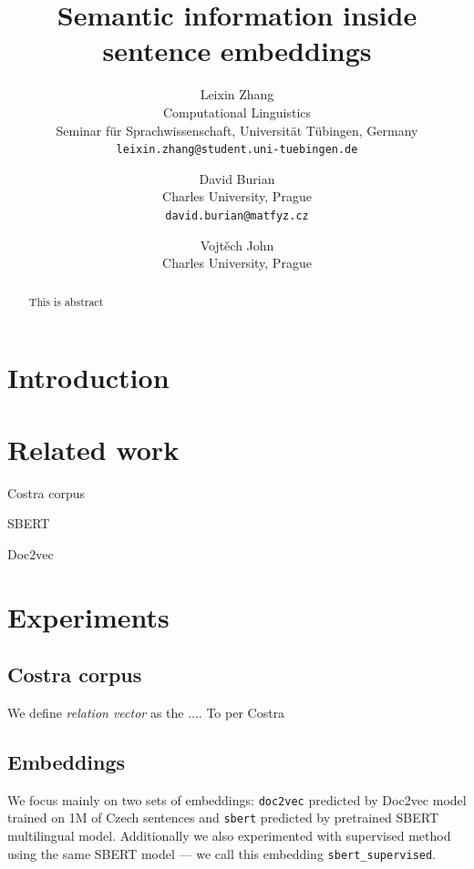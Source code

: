 \documentclass[11pt]{article}
\title{Semantic information inside sentence embeddings}
\author{Leixin Zhang \\ 
    Computational Linguistics\\
    Seminar für Sprachwissenschaft,
    Universität Tübingen, Germany \\ 
    \texttt{leixin.zhang@student.uni-tuebingen.de}
    }
\author{David Burian\\
  Charles University, Prague\\
  \texttt{david.burian@matfyz.cz}
  }
\author{Vojtěch John\\
 Charles University, Prague\\
 }
\newcommand{\Embed}[1]{\texttt{#1}}
\begin{document}
\maketitle

\begin{abstract}
This is abstract
\end{abstract}

\section{Introduction}

\section{Related work}

Costra corpus~\cite{baranvcikova2020costra}

SBERT~\cite{reimers2019sentence}

Doc2vec~\cite{le2014distributed}


\section{Experiments}

\subsection{Costra corpus}


We define \emph{relation vector} as the ....
To per
Costra 

\subsection{Embeddings}\label{sec:embeddings}

We focus mainly on two sets of embeddings: \Embed{doc2vec} predicted by Doc2vec
model trained on 1M of Czech sentences and \Embed{sbert} predicted by
pretrained SBERT multilingual model. Additionally we also experimented with
supervised method using the same SBERT model --- we call this embedding
\Embed{sbert\_supervised}.
\end{document}

